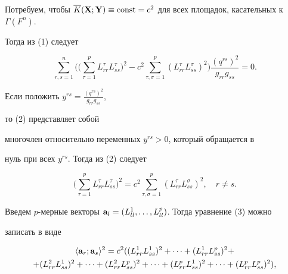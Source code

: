 \begin{pf}
Потребуем, чтобы $\overline K(\bold{X};\bold{Y})\equiv


\const=c^{2}$ для всех площадок, касательных к $\Gamma(F^{n})$.


Тогда из (1) следует


\begin{equation}


\sum_{r,s=1}^{n}\bigg(\bigg(\sum_{\tau=1}^{p}L_{rr}^{\tau}L_{ss}^{\tau}


\bigg)^{2}-c^{2}\sum_{\tau,\sigma=1}^{p}


\left(L_{rr}^{\tau}L_{ss}^{\sigma}\right)^{2}\bigg)


\frac{(q^{rs})^{2}}{g_{rr}g_{ss}}=0.


\end{equation}





Если положить $y^{rs}=\frac{(q^{rs})^{2}}{g_{rr}g_{ss}}$,


то (2) представляет собой


многочлен относительно переменных $y^{rs}>0$, который обращается в


нуль при всех $y^{rs}$. Тогда из (2) следует


\begin{equation}


\bigg(\sum_{\tau=1}^{p}L_{rr}^{\tau}L_{ss}^{\tau}\bigg)^{2}=


c^{2}\sum_{\tau,\sigma=1}^{p}(L_{rr}^{\tau}L_{ss}^{\sigma})^{2},\quad


r\neq s.


\end{equation}





Введем $p$-мерные векторы $\bold


a_{l}=(L_{ll}^{1},\dotsc,L_{ll}^{p})$. Тогда уравнение (3) можно


записать в виде


\begin{multline}


 \langle \bold a_{r};\bold a_{s} \rangle^{2}


 =c^{2}((L_{rr}^{1}L_{ss}^{1})^{2}+\dotsb+(L_{rr}^{1}L_{ss}^{p})^{2}+  \\


 +(L_{rr}^{2}L_{ss}^{1})^{2}+\dotsb+(L_{rr}^{2}L_{ss}^{p})^{2}+\dotsb+


(L_{rr}^{p}L_{ss}^{1})^{2}+\dotsb+(L_{rr}^{p}L_{ss}^{p})^{2}),



\end{multline}
\end{pf}
